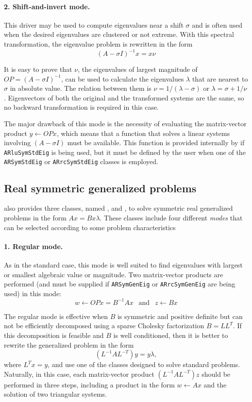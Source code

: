 \paragraph{2. Shift-and-invert mode.}
This driver may be used to compute eigenvalues near a shift $\sigma$ and is often used when the desired eigenvalues are clustered or not extreme. With this spectral transformation, the eigenvalue problem is rewritten in the form
\[(A-\sigma I)^{-1} x=x\nu\]

It is easy to prove that $\nu$, the eigenvalues of largest magnitude of $OP=(A-\sigma I)^{-1}$, can be used to calculate the eigenvalues $\lambda$ that are nearest to $\sigma$ in absolute value. The relation between them is $\nu = 1 / (\lambda - \sigma )$ or $\lambda =\sigma + 1/\nu $. Eigenvectors of both the original and the transformed systems are the same, so no backward transformation is required in this case.

The major drawback of this mode is the necessity of evaluating the matrix-vector product $y \leftarrow OPx$, which means that a function that solves a linear systems involving $(A-\sigma I)$ must be available. This function is provided internally by \ARPP{} if \texttt{ARluSymStdEig} is being used, but it must be defined by the user when one of the \texttt{ARSymStdEig} or \texttt{ARrcSymStdEig} classes is employed.

\subsection{Real symmetric generalized problems}
\ARPP{} also provides three classes, named ,  and , to solve symmetric real generalized problems in the form $Ax=Bx\lambda$. These classes include four different \textit{modes} that can be selected according to some problem characteristics 

\paragraph{1. Regular mode.}
As in the standard case, this mode is well suited to find eigenvalues with largest or smallest algebraic value or magnitude. Two matrix-vector products are performed (and must be supplied if \texttt{ARSymGenEig} or \texttt{ARrcSymGenEig} are being used) in this mode:
\[w \leftarrow OPx=B^{-1} Ax \ \ \text{ and } \ \ z \leftarrow Bx\]

The regular mode is effective when $B$ is symmetric and positive definite but can not be efficiently decomposed using a sparse Cholesky factorization $B=LL^{T}$. If this decomposition is feasible and $B$ is well conditioned, then it is better to rewrite the generalized problem in the form
\[(L^{-1} AL^{-T} )y=y\lambda,\]
where $L^{T}x=y$, and use one of the classes designed to solve standard problems. Naturally, in this case, each matrix-vector product $(L^{-1} AL^{-T})z$ should be performed in three steps, including a product in the form $w \leftarrow Ax$ and the solution of two triangular systems.

